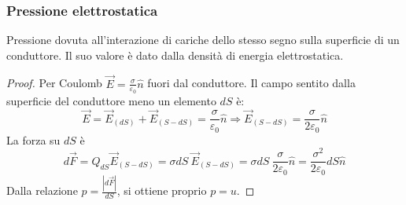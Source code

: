 \documentclass[10pt, a4paper]{scrartcl}
\numberwithin{equation}{subsection}
\theoremstyle{style1}
\newenvironment{boxenv}[1][]{
    \begin{eqbox}[#1]
    }{
   \end{eqbox}
}
\begin{document}
\subsubsection{Pressione elettrostatica}
Pressione dovuta all'interazione di cariche dello stesso segno sulla superficie di un conduttore. Il suo valore \`e dato dalla densit\`a di energia elettrostatica.
\begin{boxenv}[]
\begin{proof}
	Per Coulomb $\vec{E} = \frac{\sigma }{\varepsilon _0}\hat{n}$ fuori dal conduttore. Il campo sentito dalla superficie del conduttore meno un elemento $dS$ \`e:
	\begin{equation}
		\vec{E} = \vec{E}_{(dS)}  + \vec{E}_{(S-dS)} = \frac{\sigma}{\varepsilon _0}\hat{n} \Rightarrow \vec{E}_{(S-dS)} = \frac{\sigma }{2 \varepsilon _0} \hat{n}
	\end{equation}
	La forza su $dS$ \`e
	\begin{equation}
		d\vec{F}=Q_{dS} \vec{E}_{(S-dS)} =\sigma  dS\ \vec{E}_{(S-dS)}  = \sigma dS\ \frac{\sigma }{2\varepsilon _0}\hat{n}=\frac{\sigma ^2}{2\varepsilon _0}dS \hat{n}
	\end{equation}
	Dalla relazione $p = \frac{\left\lvert d\vec{F} \right\rvert }{dS}$, si ottiene proprio $p=u$.
\end{proof}
\end{boxenv}
\end{document}

